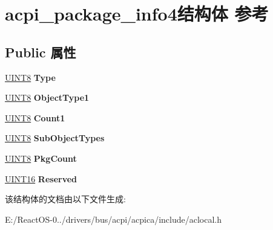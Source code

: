 \hypertarget{structacpi__package__info4}{}\section{acpi\+\_\+package\+\_\+info4结构体 参考}
\label{structacpi__package__info4}
\subsection*{Public 属性}
\begin{DoxyCompactItemize}
\item 
\mbox{\label{structacpi__package__info4_a5043c9000a3beba78280825f39102445}} 
\hyperlink{_processor_bind_8h_ab27e9918b538ce9d8ca692479b375b6a}{U\+I\+N\+T8} {\bfseries Type}
\item 
\mbox{\label{structacpi__package__info4_ab698f1c31c48e361ed64cfe74a2cbbb1}} 
\hyperlink{_processor_bind_8h_ab27e9918b538ce9d8ca692479b375b6a}{U\+I\+N\+T8} {\bfseries Object\+Type1}
\item 
\mbox{\label{structacpi__package__info4_a4a7aa0990d27a747adc456b74ad8f09f}} 
\hyperlink{_processor_bind_8h_ab27e9918b538ce9d8ca692479b375b6a}{U\+I\+N\+T8} {\bfseries Count1}
\item 
\mbox{\label{structacpi__package__info4_a8ae6b627361c54d572d1c4a44c4b3ffb}} 
\hyperlink{_processor_bind_8h_ab27e9918b538ce9d8ca692479b375b6a}{U\+I\+N\+T8} {\bfseries Sub\+Object\+Types}
\item 
\mbox{\label{structacpi__package__info4_a3580ef93e18bcc4d022eede56aae1c5e}} 
\hyperlink{_processor_bind_8h_ab27e9918b538ce9d8ca692479b375b6a}{U\+I\+N\+T8} {\bfseries Pkg\+Count}
\item 
\mbox{\label{structacpi__package__info4_a153d6f3130c4bde4373d727c99f9599f}} 
\hyperlink{_processor_bind_8h_a09f1a1fb2293e33483cc8d44aefb1eb1}{U\+I\+N\+T16} {\bfseries Reserved}
\end{DoxyCompactItemize}


该结构体的文档由以下文件生成\+:\begin{DoxyCompactItemize}
\item 
E\+:/\+React\+O\+S-\/0../drivers/bus/acpi/acpica/include/aclocal.\+h\end{DoxyCompactItemize}
